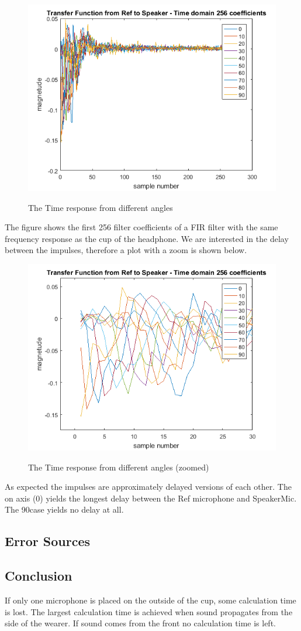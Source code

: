 \begin{figure}[H]
	\includegraphics[width=\textwidth]{../Journal/Experiments/AngleOfIncidence/AngOfIncTime.png}
	\label{Fig:AngOfIncTime}
	\caption{The Time response from different angles}
\end{figure}
The figure shows the first 256 filter coefficients of a FIR filter with the same frequency response as the cup of the headphone. We are interested in the delay between the impulses, therefore a plot with a zoom is shown below.
\begin{figure}[H]
	\includegraphics[width=\textwidth]{../Journal/Experiments/AngleOfIncidence/AngOfIncTimeZoom.png}
	\label{Fig:AngOfIncTimezoom}
	\caption{The Time response from different angles (zoomed)}
\end{figure} 
As expected the impulses are approximately delayed versions of each other. The on axis (0\textdegree) yields the longest delay between the Ref microphone and SpeakerMic. The 90\textdegree case yields no delay at all. 

\subsection{Error Sources}

\subsection{Conclusion}
If only one microphone is placed on the outside of the cup, some calculation time is lost. The largest calculation time is achieved when sound propagates from the side of the wearer. If sound comes from the front no calculation time is left. 